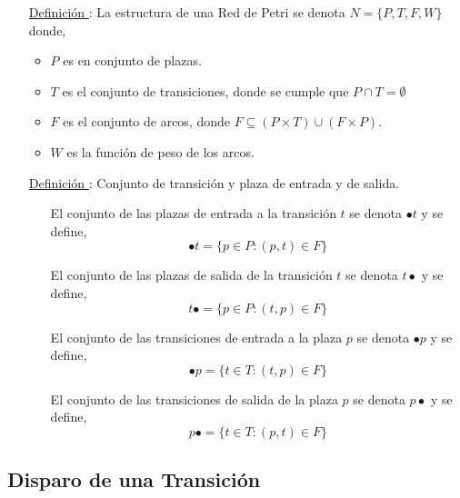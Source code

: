 \begin{itemize}
  En la figura \ref{fig:transiciones_no_sensibilizadas} se observa gráficamente esta definición mediante dos casos de transiciones no sensibilizadas. Nótese
  el peso de los arcos.

  \begin{figure}[h]
    \centering
    \texttt{[image: Transiciones\_No\_Sensibilizadas]}
    \caption{Ejemplos de transiciones no sensibilizadas.}
    \label{fig:transiciones_no_sensibilizadas}
  \end{figure}
  
  \item [\underline{Definición \thedefinitionsCounter}:] La estructura de una Red de Petri
  se denota $ N = \{P, T, F, W\} $ donde,
  \begin{itemize}
    \item $P$ es en conjunto de plazas.
    \item $T$ es el conjunto de transiciones, donde se cumple que $ P \cap T =
    \emptyset $
    \item $F$ es el conjunto de arcos, donde $ F \subseteq (P
    \times T) \cup (F \times P) $.
    \item $W$ es la función de peso de los arcos.
  \end{itemize}

  \item [\underline{Definición \thedefinitionsCounter}:] Conjunto de transición y plaza de entrada y
  de salida.
  \begin{itemize}
    \item[] El conjunto de las plazas de entrada a la transición $t$ se denota
    $\bullet t$ y se define,
    $$ \bullet t = \{ p \in P : (p, t) \in F \} $$
    \item[] El conjunto de las plazas de salida de la transición $t$ se denota $
    t \bullet$ y se define,
    $$ t \bullet = \{ p \in P : (t, p) \in F \} $$
    \item[] El conjunto de las transiciones de entrada a la plaza $p$ se
    denota $\bullet p$ y se define,
    $$ \bullet p = \{ t \in T : (t, p) \in F \} $$
    \item[] El conjunto de las transiciones de salida de la plaza $p$ se denota
    $ p \bullet$ y se define,
    $$ p \bullet = \{ t \in T : (p, t) \in F \} $$
  \end{itemize}
\end{itemize}

\subsection{Disparo de una Transición}

